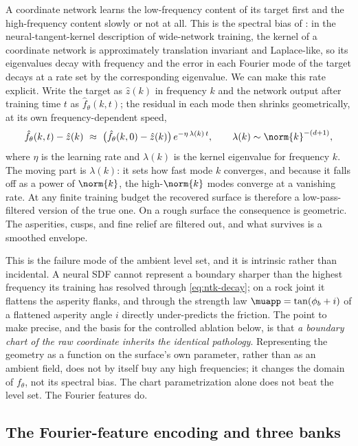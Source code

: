 A coordinate network learns the low-frequency content of its target first and the high-frequency content
slowly or not at all. This is the spectral bias of \citet{rahaman2019spectral}: in the
neural-tangent-kernel description of wide-network training, the kernel of a coordinate network is
approximately translation invariant and Laplace-like, so its eigenvalues decay with frequency and the
error in each Fourier mode of the target decays at a rate set by the corresponding eigenvalue. We can
make this rate explicit. Write the target as $\hat z(k)$ in frequency $k$ and the network output after
training time $t$ as $\hat f_\theta(k,t)$; the residual in each mode then shrinks geometrically, at its
own frequency-dependent speed,
%
\begin{equation}\label{eq:ntk-decay}
\hat f_\theta(k,t)-\hat z(k)\ \approx\ \big(\hat f_\theta(k,0)-\hat z(k)\big)\,e^{-\eta\,\lambda(k)\,t},
\qquad \lambda(k)\sim \norm{k}^{-(d+1)},
\end{equation}
%
where $\eta$ is the learning rate and $\lambda(k)$ is the kernel eigenvalue for frequency $k$. The moving
part is $\lambda(k)$: it sets how fast mode $k$ converges, and because it falls off as a power of
$\norm{k}$, the high-$\norm{k}$ modes converge at a vanishing rate. At any finite training budget the
recovered surface is therefore a low-pass-filtered version of the true one. On a rough surface the
consequence is geometric. The asperities, cusps, and fine relief are filtered out, and what survives
is a smoothed envelope.

This is the failure mode of the ambient level set, and it is intrinsic rather than incidental. A neural SDF
cannot represent a boundary sharper than the highest frequency its training has resolved through
\eqref{eq:ntk-decay}; on a rock joint it flattens the asperity flanks, and through the strength law
$\muapp=\tan(\phi_b+i)$ of \citet{patton1966multiple} a flattened asperity angle $i$ directly
under-predicts the friction. The point to make precise, and the basis for the controlled ablation below,
is that \emph{a boundary chart of the raw coordinate inherits the identical pathology}. Representing the
geometry as a function on the surface's own parameter, rather than as an ambient field, does not by itself
buy any high frequencies; it changes the domain of $f_\theta$, not its spectral bias. The chart
parametrization alone does not beat the level set. The Fourier features do.

\subsection{The Fourier-feature encoding and three banks}\label{sec:banks}

